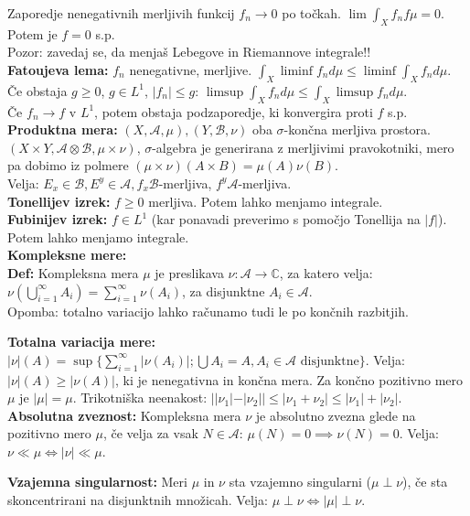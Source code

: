 \documentclass[a4paper,oneside,10pt]{article}
\theoremstyle{definition}
\renewcommand{\C}{\ensuremath{\mathbb{C}}}
\newcommand{\A}{\ensuremath{\mathcal{A}}}
\newcommand{\B}{\ensuremath{\mathcal{B}}}
\renewcommand{\C}{\ensuremath{\mathbb{C}}}
\begin{document}
Zaporedje nenegativnih merljivih funkcij $f_n \to 0$ po točkah.
$\lim \int_X f_n f \mu = 0$. Potem je $f = 0$ s.p.\\
Pozor: zavedaj se, da menjaš Lebegove in Riemannove integrale!!\\
\textbf{Fatoujeva lema: } $f_n$ nenegativne, merljive. $\int_X \liminf f_n d \mu
\leq \liminf \int_X f_n d \mu$.\\
Če obstaja $g \geq 0$, $g \in L^1$, $|f_n| \leq g$: $\limsup \int_X f_n d \mu
\leq \int_X \limsup f_n d \mu$.\\
Če $f_n \to f$ v $L^1$, potem obstaja podzaporedje, ki konvergira proti $f$ s.p.\\
\textbf{Produktna mera: }$(X, \A, \mu), (Y, \B, \nu)$ oba $\sigma$-končna merljiva
prostora. $(X \times Y, \A \otimes \B, \mu \times \nu)$, $\sigma$-algebra
je generirana z merljivimi pravokotniki, mero pa dobimo iz polmere
$(\mu \times \nu) (A \times B) = \mu(A) \nu(B)$.\\
Velja: $E_x \in \B, E^y \in \A, f_x \B$-merljiva, $f^y \A$-merljiva.\\
\textbf{Tonellijev izrek: } $f \geq 0$ merljiva. Potem lahko menjamo integrale.\\
\textbf{Fubinijev izrek: } $f \in L^1$ (kar ponavadi preverimo s pomočjo Tonellija
na $|f|$). Potem lahko menjamo integrale.\\

\textbf{\large Kompleksne mere:} \\
\textbf{Def:} Kompleksna mera $\mu$ je preslikava $\nu: \mathcal{A} \to \C$, za katero velja:
$\nu(\bigcup_{i=1}^\infty A_i) = \sum_{i=1}^\infty \nu(A_i)$, za disjunktne $A_i \in \mathcal{A}$.\\
Opomba: totalno variacijo lahko računamo tudi le po končnih razbitjih.

\textbf{Totalna variacija mere:} $|\nu|(A) = \sup\{ \sum_{i=1}^\infty |\nu(A_i)|;
\bigcup A_i = A, A_i \in \mathcal A \text{ disjunktne}\}$.
Velja: $|\nu|(A) \geq |\nu(A)|$, ki je nenegativna in končna mera. Za končno pozitivno mero $\mu$ je $|\mu| = \mu$. Trikotniška neenakost:
$||\nu_1| - |\nu_2|| \leq |\nu_1 + \nu_2| \leq |\nu_1| + |\nu_2|$. \\
\textbf{Absolutna zveznost:} Kompleksna mera $\nu$ je absolutno zvezna glede na pozitivno mero $\mu$,
če velja za vsak $N \in \mathcal{A}$: $\mu(N) = 0 \implies \nu(N) = 0$.
Velja: $\nu \ll \mu \iff |\nu| \ll \mu$.

\textbf{Vzajemna singularnost:} Meri $\mu$ in $\nu$ sta vzajemno singularni ($\mu \perp \nu$), če sta
skoncentrirani na disjunktnih množicah. Velja: $\mu \perp \nu \iff |\mu| \perp \nu$.
\end{document}

